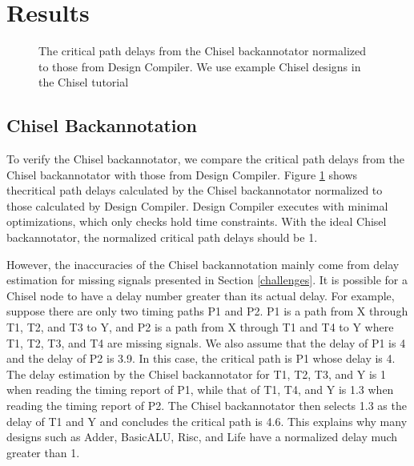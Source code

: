 \section{Results}
\begin{figure}
	\centering
    \caption{The critical path delays from the Chisel backannotator normalized to those from Design Compiler. We use example Chisel designs in the Chisel tutorial}
	\label{backresult}
\end{figure}
\subsection{Chisel Backannotation}
To verify the Chisel backannotator, we compare the critical path delays from the Chisel backannotator with those from Design Compiler. Figure \ref{backresult} shows thecritical path delays calculated by the Chisel backannotator normalized to those calculated by Design Compiler. Design Compiler executes with minimal optimizations, which only checks hold time constraints. With the ideal Chisel backannotator, the normalized critical path delays should be 1.

However, the inaccuracies of the Chisel backannotation mainly come from delay estimation for missing signals presented in Section \ref{challenges}. It is possible for a Chisel node to have a delay number greater than its actual delay. For example, suppose there are only two timing paths P1 and P2. P1 is a path from X through T1, T2, and T3 to Y, and P2 is a path from X through T1 and T4 to Y where T1, T2, T3, and T4 are missing signals. We also assume that the delay of P1 is 4 and the delay of P2 is 3.9. In this case, the critical path is P1 whose delay is 4. The delay estimation by the Chisel backannotator for T1, T2, T3, and Y is 1 when reading the timing report of P1, while that of T1, T4, and Y is 1.3 when reading the timing report of P2. The Chisel backannotator then selects 1.3 as the delay of T1 and Y and concludes the critical path is 4.6. This explains why many designs such as Adder, BasicALU, Risc, and Life have a normalized delay much greater than 1.

